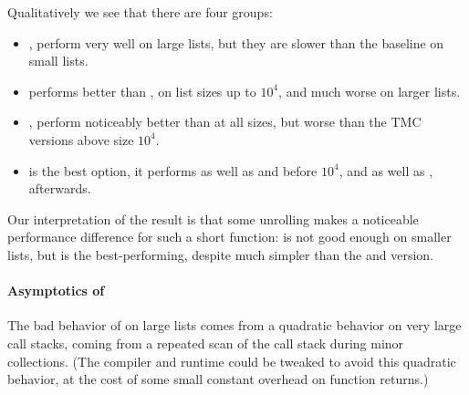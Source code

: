 Qualitatively we see that there are four groups:
\begin{itemize}
\item {},  perform very well on large lists, but they
  are slower than the baseline on small lists.
\item {} performs better than ,  on list sizes up to $10^4$, and much worse on larger lists.
\item {},  perform noticeably better than  at all sizes,
  but worse than the TMC versions above size $10^4$.
\item {} is the best option, it performs as well as  and  before $10^4$, and as well as ,  afterwards.
\end{itemize}
Our interpretation of the result is that some unrolling makes a noticeable performance difference for such a short function:  is not good enough on smaller lists, but  is the best-performing, despite much simpler than the  and  version.

\paragraph{Asymptotics of } The bad behavior of  on large lists comes from a quadratic behavior on very large call stacks, coming from a repeated scan of the call stack during minor collections. (The \OCaml compiler and runtime could be tweaked to avoid this quadratic behavior, at the cost of some small constant overhead on function returns.)


